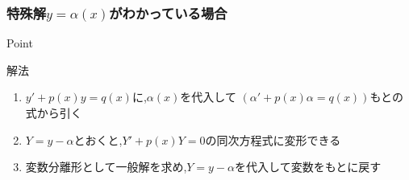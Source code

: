 \documentclass[a4paper]{jsarticle}
\begin{document}
\subsubsection{特殊解$y=\alpha\left(x\right)$がわかっている場合}
\begin{itembox}[l]{Point}
    \begin{center}
    \end{center}
\end{itembox}
\begin{itembox}[l]{解法}
    \begin{enumerate}[(1)]
        \item $y'+p\left(x\right)y=q\left(x\right)$に,$\alpha\left(x\right)$を代入して
              $\left(\alpha'+p\left(x\right)\alpha=q\left(x\right)\right)$もとの式から引く
        \item $Y=y-\alpha$とおくと,$Y'+p\left(x\right)Y=0$の同次方程式に変形できる
        \item 変数分離形として一般解を求め,$Y=y-\alpha$を代入して変数をもとに戻す
    \end{enumerate}
\end{itembox}
\end{document}
